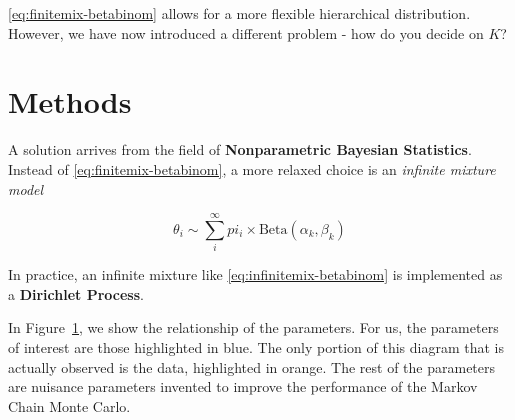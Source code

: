 \documentclass{article}
\begin{document}
\eqref{eq:finitemix-betabinom} allows for a more flexible hierarchical distribution. However, we have now introduced a different problem - how do you decide on $K$?

\section{Methods}

A solution arrives from the field of \textbf{Nonparametric Bayesian Statistics}. Instead of \eqref{eq:finitemix-betabinom}, a more relaxed choice is an \textit{infinite mixture model}

\begin{equation}\label{eq:infinitemix-betabinom}
\theta_i \sim \sum_i^{\infty} pi_i \times \text{Beta}(\alpha_k, \beta_k)
\end{equation}

In practice, an infinite mixture like \eqref{eq:infinitemix-betabinom} is implemented as a \textbf{Dirichlet Process}.

\begin{figure}
\centering
{}
\label{fig:diagram}
\end{figure}


In Figure~\ref{fig:diagram}, we show the relationship of the parameters. For us, the parameters of interest are those highlighted in {\color{blue}blue}. The only portion of this diagram that is actually observed is the data, highlighted in {\color{orange}orange}. The rest of the parameters are nuisance parameters invented to improve the performance of the Markov Chain Monte Carlo.
\end{document}
